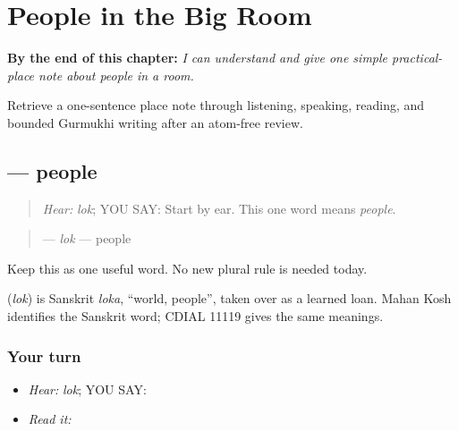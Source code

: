 
\chapter{People in the Big Room}
\label{ch:pa-a2-place-reference}

\begin{chapteropening}
\textbf{By the end of this chapter:} \emph{I can understand and give one simple practical-place note about people in a room.}

Retrieve a one-sentence place note through listening, speaking, reading, and bounded Gurmukhi writing after an atom-free review.
\end{chapteropening}

\section[\texorpdfstring{\pa{ਲੋਕ} (lok)}{ਲੋਕ (lok)}]{ — people}

\label{lesson:PA-C180-lok}



\begin{quote}
\emph{Hear:} \emph{lok}; YOU SAY: \textbf{} Start by ear. This one word means \emph{people}.
\end{quote}

\begin{grammarlens}[title={Grammar Lens: one group word}]
\begin{quote}
\textbf{} — \emph{lok} — people
\end{quote}

Keep this as one useful word. No new plural rule is needed today.
\end{grammarlens}

\begin{cousinweb}
\textbf{} (\emph{lok}) is Sanskrit \emph{loka}, \textquotedblleft{}world, people\textquotedblright{}, taken over as a learned loan. Mahan Kosh identifies the Sanskrit word; CDIAL 11119 gives the same meanings.
\end{cousinweb}

\subsection*{Your turn}
\begin{itemize}
\raggedright
  \item \emph{Hear:} \emph{lok}; YOU SAY: \textbf{}
  \item \emph{Read it:} \textbf{}
\end{itemize}

